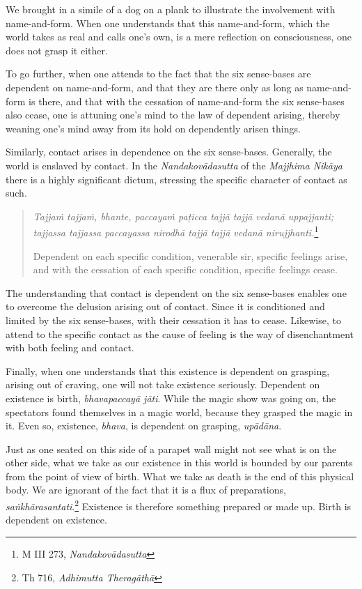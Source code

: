 We brought in a simile of a dog on a plank to illustrate the involvement with name-and-form. When one understands that this name-and-form, which the world takes as real and calls one's own, is a mere reflection on consciousness, one does not grasp it either.

To go further, when one attends to the fact that the six sense-bases are dependent on name-and-form, and that they are there only as long as name-and-form is there, and that with the cessation of name-and-form the six sense-bases also cease, one is attuning one's mind to the law of dependent arising, thereby weaning one's mind away from its hold on dependently arisen things.

Similarly, contact arises in dependence on the six sense-bases. Generally, the world is enslaved by contact. In the \emph{Nandakovādasutta} of the \emph{Majjhima Nikāya} there is a highly significant dictum, stressing the specific character of contact as such.

\begin{quote}
\emph{Tajjaṁ tajjaṁ, bhante, paccayaṁ paṭicca tajjā tajjā vedanā uppajjanti; tajjassa tajjassa paccayassa nirodhā tajjā tajjā vedanā nirujjhanti.}\footnote{M III 273, \emph{Nandakovādasutta}}

Dependent on each specific condition, venerable sir, specific feelings arise, and with the cessation of each specific condition, specific feelings cease.
\end{quote}

The understanding that contact is dependent on the six sense-bases enables one to overcome the delusion arising out of contact. Since it is conditioned and limited by the six sense-bases, with their cessation it has to cease. Likewise, to attend to the specific contact as the cause of feeling is the way of disenchantment with both feeling and contact.

Finally, when one understands that this existence is dependent on grasping, arising out of craving, one will not take existence seriously. Dependent on existence is birth, \emph{bhavapaccayā jāti}. While the magic show was going on, the spectators found themselves in a magic world, because they grasped the magic in it. Even so, existence, \emph{bhava}, is dependent on grasping, \emph{upādāna}.

Just as one seated on this side of a parapet wall might not see what is on the other side, what we take as our existence in this world is bounded by our parents from the point of view of birth. What we take as death is the end of this physical body. We are ignorant of the fact that it is a flux of preparations, \emph{saṅkhārasantati}.\footnote{Th 716, \emph{Adhimutta Theragāthā}} Existence is therefore something prepared or made up. Birth is dependent on existence.

